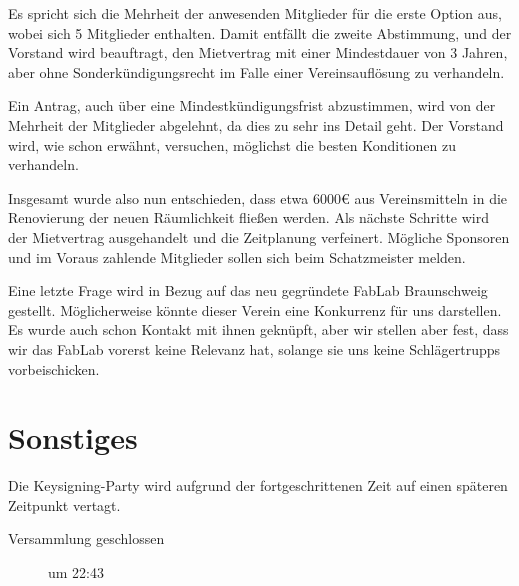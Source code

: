\documentclass[a4paper,12pt]{scrartcl}
\begin{document}
Es spricht sich die Mehrheit der anwesenden Mitglieder für die erste Option aus,
wobei sich 5 Mitglieder enthalten. Damit entfällt die zweite Abstimmung, und der
Vorstand wird beauftragt, den Mietvertrag mit einer Mindestdauer von 3 Jahren,
aber ohne Sonderkündigungsrecht im Falle einer Vereinsauflösung zu verhandeln.

Ein Antrag, auch über eine Mindestkündigungsfrist abzustimmen, wird von der
Mehrheit der Mitglieder abgelehnt, da dies zu sehr ins Detail geht. Der Vorstand
wird, wie schon erwähnt, versuchen, möglichst die besten Konditionen zu
verhandeln.

Insgesamt wurde also nun entschieden, dass etwa 6000€ aus Vereinsmitteln in die
Renovierung der neuen Räumlichkeit fließen werden. Als nächste Schritte wird der
Mietvertrag ausgehandelt und die Zeitplanung verfeinert. Mögliche Sponsoren und
im Voraus zahlende Mitglieder sollen sich beim Schatzmeister melden.

Eine letzte Frage wird in Bezug auf das neu gegründete FabLab Braunschweig
gestellt. Möglicherweise könnte dieser Verein eine Konkurrenz für uns
darstellen. Es wurde auch schon Kontakt mit ihnen geknüpft, aber wir stellen
aber fest, dass wir das FabLab vorerst keine Relevanz hat, solange sie uns keine
Schlägertrupps vorbeischicken.


\section{Sonstiges}
Die Keysigning-Party wird aufgrund der fortgeschrittenen Zeit auf einen späteren
Zeitpunkt vertagt.

\begin{description}
  \item[Versammlung geschlossen] um 22:43
\end{description}


\appendix

\newcommand{\includepage}[1]{%
  \begin{center}
    \fbox{
      \texttt{[image: images/vorstellung-space2-0.pdf]}%
    }%
  \end{center}%
}
\newcommand{\anmerkung}[1]{#1}
\end{document}
